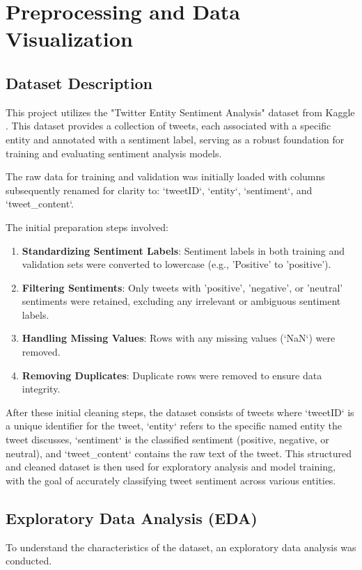 
\section{Preprocessing and Data Visualization}
\label{sec:DatasetAndPreprocessing}

\subsection{Dataset Description}

This project utilizes the "Twitter Entity Sentiment Analysis" dataset from Kaggle \cite{twitter_dataset}. This dataset provides a collection of tweets, each associated with a specific entity and annotated with a sentiment label, serving as a robust foundation for training and evaluating sentiment analysis models.

The raw data for training and validation was initially loaded with columns subsequently renamed for clarity to: `tweetID`, `entity`, `sentiment`, and `tweet\_content`.

The initial preparation steps involved:
\begin{enumerate}
    \item \textbf{Standardizing Sentiment Labels}: Sentiment labels in both training and validation sets were converted to lowercase (e.g., 'Positive' to 'positive').
    \item \textbf{Filtering Sentiments}: Only tweets with 'positive', 'negative', or 'neutral' sentiments were retained, excluding any irrelevant or ambiguous sentiment labels.
    \item \textbf{Handling Missing Values}: Rows with any missing values (`NaN`) were removed.
    \item \textbf{Removing Duplicates}: Duplicate rows were removed  to ensure data integrity.
\end{enumerate}

After these initial cleaning steps, the dataset consists of tweets where `tweetID` is a unique identifier for the tweet, `entity` refers to the specific named entity the tweet discusses, `sentiment` is the classified sentiment (positive, negative, or neutral), and `tweet\_content` contains the raw text of the tweet. This structured and cleaned dataset is then used for exploratory analysis and model training, with the goal of accurately classifying tweet sentiment across various entities.

\subsection{Exploratory Data Analysis (EDA)}
To understand the characteristics of the dataset, an exploratory data analysis was conducted.


